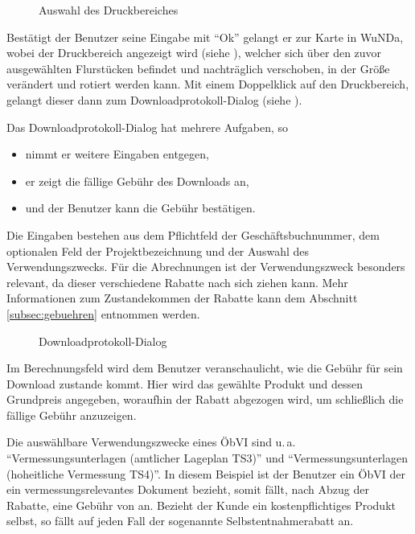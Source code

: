 \begin{figure}[htb]
	\centering
	\caption{Auswahl des Druckbereiches}
	\label{fig:alkis-auswahl}
\end{figure}

Bestätigt der Benutzer seine Eingabe mit "`Ok"' gelangt er zur Karte in \ac{WuNDa}, wobei der Druckbereich angezeigt wird (siehe ), welcher sich über den zuvor ausgewählten Flurstücken befindet und nachträglich verschoben, in der Größe verändert und rotiert werden kann.
Mit einem Doppelklick auf den Druckbereich, gelangt dieser dann zum Downloadprotokoll-Dialog (siehe ).  

Das Downloadprotokoll-Dialog hat mehrere Aufgaben, so 
\begin{itemize}
\item nimmt er weitere Eingaben entgegen,
\item er zeigt die fällige Gebühr des Downloads an,
\item und der Benutzer kann die Gebühr bestätigen.
\end{itemize}

Die Eingaben bestehen aus dem Pflichtfeld der Geschäftsbuchnummer, dem optionalen Feld der Projektbezeichnung und der Auswahl des Verwendungszwecks.
Für die Abrechnungen ist der Verwendungszweck besonders relevant, da dieser verschiedene Rabatte nach sich ziehen kann. Mehr Informationen zum Zustandekommen der Rabatte kann dem Abschnitt \ref{subsec:gebuehren} entnommen werden.

\begin{figure}[htb]
	\centering
	\caption{Downloadprotokoll-Dialog}
	\label{fig:alkis-protocol}
\end{figure}

Im Berechnungsfeld wird dem Benutzer veranschaulicht, wie die Gebühr für sein Download zustande kommt. Hier wird das gewählte Produkt und dessen Grundpreis angegeben, woraufhin der Rabatt abgezogen wird, um schließlich die fällige Gebühr anzuzeigen.

Die auswählbare Verwendungszwecke eines \ac{ÖbVI} sind u.\,a. "`Vermessungsunterlagen (amtlicher Lageplan TS3)"' und "`Vermessungsunterlagen (hoheitliche Vermessung TS4)"'.
In diesem Beispiel ist der Benutzer ein \ac{ÖbVI} der ein vermessungsrelevantes Dokument bezieht, somit fällt, nach Abzug der Rabatte, eine Gebühr von  an.
Bezieht der Kunde ein kostenpflichtiges Produkt selbst, so fällt auf jeden Fall der sogenannte Selbstentnahmerabatt an. 

